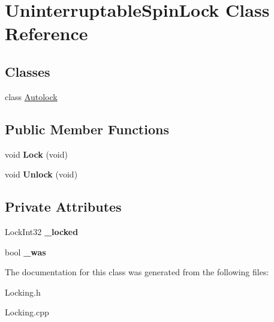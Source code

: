 \hypertarget{class_uninterruptable_spin_lock}{}\section{Uninterruptable\+Spin\+Lock Class Reference}
\label{class_uninterruptable_spin_lock}
\subsection*{Classes}
\begin{DoxyCompactItemize}
\item 
class \hyperlink{class_uninterruptable_spin_lock_1_1_autolock}{Autolock}
\end{DoxyCompactItemize}
\subsection*{Public Member Functions}
\begin{DoxyCompactItemize}
\item 
\mbox{\label{class_uninterruptable_spin_lock_a41e8575ea977ec744426bf967ddb30f8}} 
void {\bfseries Lock} (void)
\item 
\mbox{\label{class_uninterruptable_spin_lock_a9be98699af870b5c46fe9e467b6e0ee3}} 
void {\bfseries Unlock} (void)
\end{DoxyCompactItemize}
\subsection*{Private Attributes}
\begin{DoxyCompactItemize}
\item 
\mbox{\label{class_uninterruptable_spin_lock_a4be29ea73dce686fae4e30af53a12f96}} 
Lock\+Int32 {\bfseries \+\_\+locked}
\item 
\mbox{\label{class_uninterruptable_spin_lock_af6ebb66d1379211c02b5d7bb0edef6a0}} 
bool {\bfseries \+\_\+was}
\end{DoxyCompactItemize}


The documentation for this class was generated from the following files\+:\begin{DoxyCompactItemize}
\item 
Locking.\+h\item 
Locking.\+cpp\end{DoxyCompactItemize}
